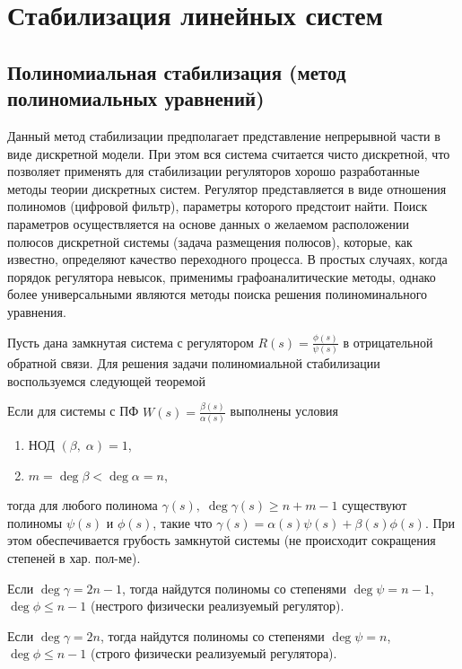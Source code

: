 \documentclass[../../TAU.tex]{subfiles}
\begin{document}
\chapter{Стабилизация линейных систем}

\section{Полиномиальная стабилизация (метод полиномиальных уравнений)}

    Данный метод стабилизации предполагает представление непрерывной части в виде дискретной модели. 
    При этом вся система считается чисто дискретной, что позволяет применять для стабилизации регуляторов хорошо разработанные методы теории дискретных систем. 
    Регулятор представляется в виде отношения полиномов (цифровой фильтр), параметры которого предстоит найти. 
    Поиск параметров осуществляется на основе данных о желаемом расположении полюсов дискретной системы (задача размещения полюсов), которые, как известно, определяют качество переходного процесса. 
    В простых случаях, когда порядок регулятора невысок, применимы графоаналитические методы, однако более универсальными являются методы поиска решения полиноминального уравнения.
    \cite[стр. 98]{yashin}


    Пусть дана замкнутая система с регулятором $R(s) = \frac{\phi(s)}{\psi(s)}$ в отрицательной обратной связи. 
    Для решения задачи полиномиальной стабилизации воспользуемся следующей теоремой
    \begin{theor}\label{TH1} 
        Если для системы с ПФ $W(s) = \frac{\beta(s)}{\alpha(s)}$ выполнены условия
        \begin{enumerate}
            \item НОД $(\beta,\; \alpha) = 1$,
            \item $m = \deg\beta< \deg\alpha = n$,
        \end{enumerate}
        тогда для любого полинома $\gamma(s),\; \deg\gamma(s) \ge n+m-1$ существуют полиномы $\psi(s)$ и $\phi(s)$, такие что
        $\gamma(s) = \alpha(s)\psi(s) + \beta(s)\phi(s)$. При этом обеспечивается грубость замкнутой системы (не происходит сокращения степеней в хар. пол-ме).
    \end{theor}
    \proof \cite[стр. 78-79]{pervoz}


    \begin{coroll}
        Если $\deg\gamma = 2n-1$, тогда найдутся полиномы со степенями $\deg\psi = n-1$, $\deg\phi \le n-1$ (нестрого физически реализуемый регулятор).
    \end{coroll}
    \begin{coroll}
        Если $\deg\gamma = 2n$, тогда найдутся полиномы со степенями $\deg\psi = n$, $\deg\phi \le n-1$ (строго физически реализуемый регулятора).
    \end{coroll}
\end{document}
